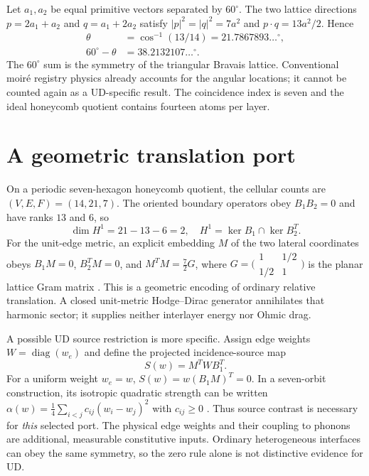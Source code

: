 \documentclass[9pt,a4paper,twocolumn]{extarticle}
\begin{document}
Let $a_1,a_2$ be equal primitive vectors separated by $60^\circ$. The two lattice directions $p=2a_1+a_2$ and $q=a_1+2a_2$ satisfy $|p|^2=|q|^2=7a^2$ and $p\cdot q=13a^2/2$. Hence
\begin{equation}
 \begin{aligned}
 \theta &= \cos^{-1}(13/14)=21.7867893\ldots^\circ,\\
 60^\circ-\theta &=38.2132107\ldots^\circ.
 \end{aligned} \label{eq:angle}
\end{equation}
The $60^\circ$ sum is the symmetry of the triangular Bravais lattice. Conventional moir\'e registry physics already accounts for the angular locations; it cannot be counted again as a UD-specific result. The coincidence index is seven and the ideal honeycomb quotient contains fourteen atoms per layer.

\section{A geometric translation port}
On a periodic seven-hexagon honeycomb quotient, the cellular counts are $(V,E,F)=(14,21,7)$. The oriented boundary operators obey $B_1B_2=0$ and have ranks $13$ and $6$, so
\begin{equation}
 \dim H^1=21-13-6=2,\quad H^1=\ker B_1\cap\ker B_2^T. \label{eq:h1}
\end{equation}
For the unit-edge metric, an explicit embedding $M$ of the two lateral coordinates obeys $B_1M=0$, $B_2^TM=0$, and $M^TM=\frac72G$, where $G=\bigl(\begin{smallmatrix}1&1/2\\1/2&1\end{smallmatrix}\bigr)$ is the planar lattice Gram matrix \cite{udrecord}. This is a geometric encoding of ordinary relative translation. A closed unit-metric Hodge--Dirac generator annihilates that harmonic sector; it supplies neither interlayer energy nor Ohmic drag.

A possible UD source restriction is more specific. Assign edge weights $W=\operatorname{diag}(w_e)$ and define the projected incidence-source map
\begin{equation}
 S(w)=M^TWB_1^T. \label{eq:source}
\end{equation}
For a uniform weight $w_e=w$, $S(w)=w(B_1M)^T=0$. In a seven-orbit construction, its isotropic quadratic strength can be written $\alpha(w)=\frac14\sum_{i<j}c_{ij}(w_i-w_j)^2$ with $c_{ij}\geq0$ \cite{udrecord}. Thus source contrast is necessary for \emph{this} selected port. The physical edge weights and their coupling to phonons are additional, measurable constitutive inputs. Ordinary heterogeneous interfaces can obey the same symmetry, so the zero rule alone is not distinctive evidence for UD.
\end{document}
